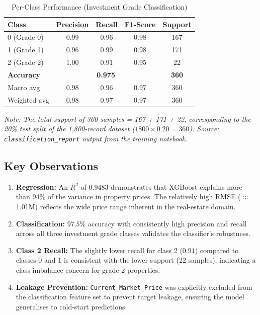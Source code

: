 \documentclass[12pt,a4paper]{article}
\begin{document}
\begin{table}[H]
\centering
\caption{Per-Class Performance (Investment Grade Classification)}
\begin{tabular}{@{} l c c c c @{}}
\toprule
\textbf{Class} & \textbf{Precision} & \textbf{Recall} & \textbf{F1-Score} & \textbf{Support} \\
\midrule
0 (Grade 0) & 0.99 & 0.96 & 0.98 & 167 \\
1 (Grade 1) & 0.96 & 0.99 & 0.98 & 171 \\
2 (Grade 2) & 1.00 & 0.91 & 0.95 &  22 \\
\midrule
\textbf{Accuracy}    & \multicolumn{3}{c}{\textbf{0.975}} & \textbf{360} \\
Macro avg            & 0.98 & 0.96 & 0.97 & 360 \\
Weighted avg         & 0.98 & 0.97 & 0.97 & 360 \\
\bottomrule
\end{tabular}
\end{table}

\noindent\small\textit{Note: The total support of 360 samples = 167 + 171 + 22, corresponding to the 20\% test split of the 1,800-record dataset ($1800 \times 0.20 = 360$). Source: \texttt{classification\_report} output from the training notebook.}\normalsize

\subsection{Key Observations}

\begin{enumerate}
    \item \textbf{Regression:} An $R^2$ of $0.9483$ demonstrates that XGBoost explains more than
          $94\%$ of the variance in property prices. The relatively high RMSE ($\approx$1.01M)
          reflects the wide price range inherent in the real-estate domain.
    \item \textbf{Classification:} $97.5\%$ accuracy with consistently high precision and recall
          across all three investment grade classes validates the classifier's robustness.
    \item \textbf{Class 2 Recall:} The slightly lower recall for class 2 ($0.91$) compared to
          classes 0 and 1 is consistent with the lower support (22 samples), indicating a
          class imbalance concern for grade 2 properties.
    \item \textbf{Leakage Prevention:} \texttt{Current\_Market\_Price} was explicitly excluded
          from the classification feature set to prevent target leakage, ensuring the model
          generalises to cold-start predictions.
\end{enumerate}
\end{document}
